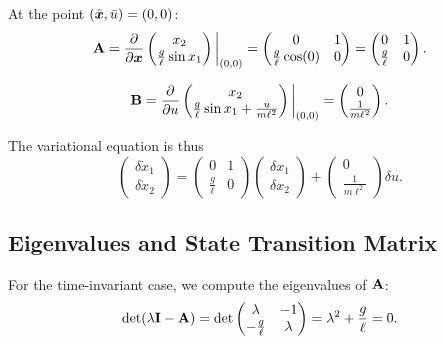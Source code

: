 At the point $(\bar{\bm{x}}, \bar u) = (0,0)$:
\begin{equation}
\mathbf{A} = \frac{\partial}{\partial \bm{x}}\begin{pmatrix}x_2\\\frac{g}{\ell}\sin x_1\end{pmatrix}\bigg|_{(0,0)}
= \begin{pmatrix}0 & 1\\\frac{g}{\ell}\cos(0) & 0\end{pmatrix}
= \begin{pmatrix}0 & 1\\\frac{g}{\ell} & 0\end{pmatrix}.
\label{eq:ch2:pend-A}
\end{equation}

\begin{equation}
\mathbf{B} = \frac{\partial}{\partial u}\begin{pmatrix}x_2\\\frac{g}{\ell}\sin x_1 + \frac{u}{m\ell^2}\end{pmatrix}\bigg|_{(0,0)}
= \begin{pmatrix}0\\\frac{1}{m\ell^2}\end{pmatrix}.
\label{eq:ch2:pend-B}
\end{equation}

The variational equation is thus
\begin{equation}
\begin{pmatrix}\delta\dot x_1\\\delta\dot x_2\end{pmatrix}
= \begin{pmatrix}0 & 1\\\frac{g}{\ell} & 0\end{pmatrix}\begin{pmatrix}\delta x_1\\\delta x_2\end{pmatrix}
+ \begin{pmatrix}0\\\frac{1}{m\ell^2}\end{pmatrix}\delta u.
\label{eq:ch2:pend-variational}
\end{equation}

\subsection{Eigenvalues and State Transition Matrix}

For the time-invariant case, we compute the eigenvalues of $\mathbf{A}$:
\begin{equation}
\det(\lambda \mathbf{I} - \mathbf{A}) = \det\begin{pmatrix}\lambda & -1\\-\frac{g}{\ell} & \lambda\end{pmatrix}
= \lambda^2 + \frac{g}{\ell} = 0.
\end{equation}

